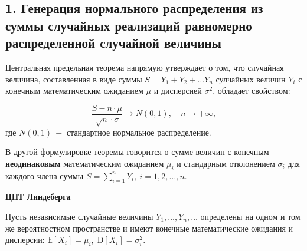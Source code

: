 \documentclass[
]{article}
\begin{document}
\hypertarget{ux433ux435ux43dux435ux440ux430ux446ux438ux44f-ux43dux43eux440ux43cux430ux43bux44cux43dux43eux433ux43e-ux440ux430ux441ux43fux440ux435ux434ux435ux43bux435ux43dux438ux44f-ux438ux437-ux441ux443ux43cux43cux44b-ux441ux43bux443ux447ux430ux439ux43dux44bux445-ux440ux435ux430ux43bux438ux437ux430ux446ux438ux439-ux440ux430ux432ux43dux43eux43cux435ux440ux43dux43e-ux440ux430ux441ux43fux440ux435ux434ux435ux43bux435ux43dux43dux43eux439-ux441ux43bux443ux447ux430ux439ux43dux43eux439-ux432ux435ux43bux438ux447ux438ux43dux44b}{%
\subsection{\texorpdfstring{\textbf{1. Генерация нормального
распределения из суммы случайных реализаций равномерно распределенной
случайной
величины}}{1. Генерация нормального распределения из суммы случайных реализаций равномерно распределенной случайной величины}}\label{ux433ux435ux43dux435ux440ux430ux446ux438ux44f-ux43dux43eux440ux43cux430ux43bux44cux43dux43eux433ux43e-ux440ux430ux441ux43fux440ux435ux434ux435ux43bux435ux43dux438ux44f-ux438ux437-ux441ux443ux43cux43cux44b-ux441ux43bux443ux447ux430ux439ux43dux44bux445-ux440ux435ux430ux43bux438ux437ux430ux446ux438ux439-ux440ux430ux432ux43dux43eux43cux435ux440ux43dux43e-ux440ux430ux441ux43fux440ux435ux434ux435ux43bux435ux43dux43dux43eux439-ux441ux43bux443ux447ux430ux439ux43dux43eux439-ux432ux435ux43bux438ux447ux438ux43dux44b}}

Центральная предельная теорема напрямую утверждает о том, что случайная
величина, составленная в виде суммы \(S = Y_1 + Y_2 + \dots Y_n\)
сулчайных величин \(Y_i\) с конечным математическим ожиданием \(\mu\) и
дисперсией \(\sigma^2\), обладает свойством:

\[
  \frac{S - n\cdot \mu}{\sqrt{n} \cdot \sigma} \to N(0, 1), \quad n\rightarrow +\infty,
\] где \(N(0, 1)\ -\) стандартное нормальное распределение.

В другой формулировке теоремы говорится о сумме величин с конечным
\textbf{неодинаковым} математическим ожиданием \(\mu_i\) и стандарным
отклонением \(\sigma_i\) для каждого члена суммы
\(S = \sum_{i=1}^nY_i, \ i=1,2,\dots, n\).

\textbf{ЦПТ Линдеберга}

Пусть независимые случайные величины \(Y_{1},\ldots ,Y_{n},\ldots\)
определены на одном и том же вероятностном пространстве и имеют конечные
математические ожидания и дисперсии:
\({\mathbb {E}}[X_{i}]=\mu _{i},\;{\mathrm {D}}[X_{i}]=\sigma _{i}^{2}\).
\end{document}
